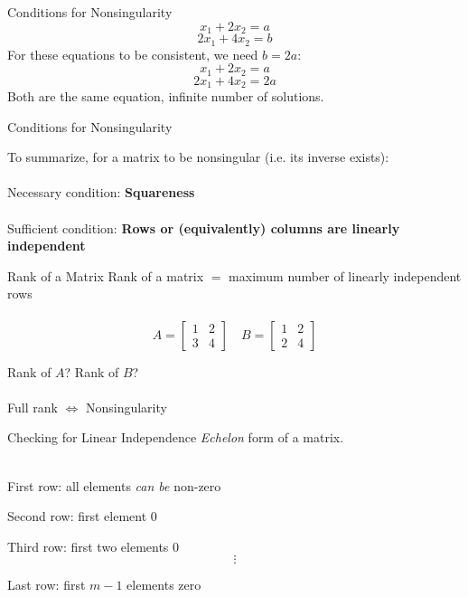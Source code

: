 \documentclass{./../../Latex/teaching_slides}
\begin{document}
\begin{frame}{Conditions for Nonsingularity}
$$ x_1+2x_2 = a $$
$$ 2x_1+4x_2 = b $$
For these equations to be consistent, we need $b=2a$:
$$ x_1+2x_2 = a $$
$$ 2x_1+4x_2 = 2a $$
Both are the same equation, infinite number of solutions.
\end{frame}

\begin{frame}{Conditions for Nonsingularity}
\vspace{1em}

To summarize, for a matrix to be nonsingular (i.e. its inverse exists): \\~\\

Necessary condition: \textbf{Squareness} \\~\\

Sufficient condition: \textbf{Rows or (equivalently) columns are linearly independent} 

\end{frame}


\begin{frame}{Rank of a Matrix}
Rank of a matrix $=$ maximum number of linearly independent rows \\~\\
$$A=\left[\begin{array}{ll}
1 & 2 \\
3 & 4
\end{array}\right]
\quad
B=\left[\begin{array}{ll}
1 & 2 \\
2 & 4
\end{array}\right]
$$
\vspace{1em}

Rank of $A$? Rank of $B$? \\~\\
\pause
Full rank $ \iff $ Nonsingularity
\end{frame}

\begin{frame}{Checking for Linear Independence}
\textit{Echelon} form of a matrix. \\~\\
\begin{witemize}
\item First row: all elements \textit{can be} non-zero
\item Second row: first element $0$
\item Third row: first two elements $0$
$$\vdots$$
\item Last row: first $m-1$ elements zero
\end{witemize}
\end{frame}
\end{document}
